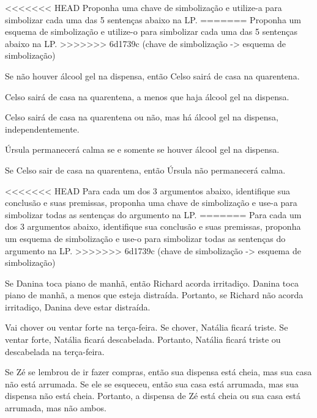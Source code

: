 \solutions
<<<<<<< HEAD
\problempart Proponha uma chave de simbolização e utilize-a para simbolizar  cada uma das 5 sentenças abaixo na LP.
=======
\problempart Proponha um esquema de simbolização e utilize-o para simbolizar  cada uma das 5 sentenças abaixo na LP.
>>>>>>> 6d1739c (chave de simbolização -> esquema de simbolização)
\begin{earg}
	\item Se não houver álcool gel na dispensa, então Celso sairá de casa na quarentena.
	\item Celso sairá de casa na quarentena, a menos que haja álcool gel na dispensa.
	\item Celso sairá de casa na quarentena ou não, mas há álcool gel na dispensa, independentemente.
	\item Úrsula permanecerá calma se e somente se houver álcool gel na dispensa.
	\item Se Celso sair de casa na quarentena, então Úrsula não permanecerá calma.
\end{earg}

\problempart
<<<<<<< HEAD
Para cada um dos 3 argumentos abaixo, identifique sua conclusão e suas premissas, proponha uma chave de simbolização e use-a para simbolizar todas as sentenças do argumento na LP.
=======
Para cada um dos 3 argumentos abaixo, identifique sua conclusão e suas premissas, proponha um esquema de simbolização e use-o para simbolizar todas as sentenças do argumento na LP.
>>>>>>> 6d1739c (chave de simbolização -> esquema de simbolização)
\begin{earg}
	\item Se Danina toca piano de manhã, então Richard acorda irritadiço. Danina toca piano de manhã, a menos que esteja distraída. Portanto, se Richard não acorda irritadiço, Danina deve estar distraída.
	\item Vai chover ou ventar forte na terça-feira. Se chover, Natália ficará triste. Se ventar forte, Natália ficará descabelada. Portanto, Natália ficará triste ou descabelada na terça-feira.
	\item Se Zé se lembrou de ir fazer compras, então sua dispensa está cheia, mas sua casa não está arrumada. Se ele se esqueceu, então sua casa está arrumada, mas sua dispensa não está cheia. Portanto, a dispensa de Zé está cheia ou sua casa está arrumada, mas não ambos.
\end{earg}

